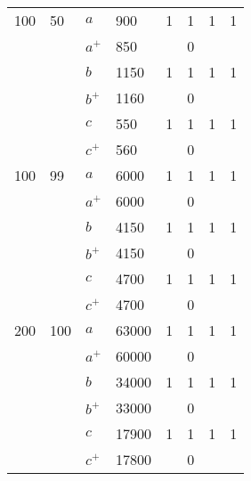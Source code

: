 \begin{table}
\begin{tabular}{lll|lllll}
	100 & 50           & $a$   		& 900     	 & 1          & 1           & 1         & 1 \\
    ~   & ~            & $a^+$		& 850        & ~          & 0         	& ~ 		& ~ \\ \cline{3-8}
    ~   & ~            & $b$    	& 1150       & 1          & 1           & 1         & 1 \\
    ~   & ~            & $b^+$		& 1160       & ~          & 0           & ~ 		& ~ \\ \cline{3-8}
    ~   & ~            & $c$   		& 550        & 1          & 1           & 1         & 1 \\
    ~   & ~            & $c^+$		& 560        & ~          & 0           & ~ 		& ~ \\ \hline \hline
    
    100 & 99           & $a$   		& 6000       & 1          & 1           & 1         & 1 \\
    ~   & ~            & $a^+$		& 6000       & ~          & 0           & ~ 		& ~ \\ \cline{3-8}
    ~   & ~            & $b$    	& 4150       & 1          & 1           & 1         & 1 \\
    ~   & ~            & $b^+$		& 4150       & ~          & 0           & ~ 		& ~ \\ \cline{3-8}
    ~   & ~            & $c$   		& 4700       & 1          & 1           & 1         & 1 \\
    ~   & ~            & $c^+$		& 4700       & ~          & 0           & ~ 		& ~ \\ \hline \hline
    
    200 & 100          & $a$   		& 63000      & 1          & 1           & 1         & 1 \\
    ~   & ~            & $a^+$		& 60000      & ~          & 0           & ~ 		& ~ \\ \cline{3-8}
    ~   & ~            & $b$    	& 34000      & 1          & 1           & 1         & 1 \\
    ~   & ~            & $b^+$		& 33000      & ~  		  & 0           & ~			& ~ \\ \cline{3-8}
    ~   & ~            & $c$    	& 17900      & 1          & 1           & 1         & 1 \\
    ~   & ~            & $c^+$		& 17800      & ~          & 0           & ~ 		& ~ \\ \hline
    
    \end{tabular}
\end{table}
